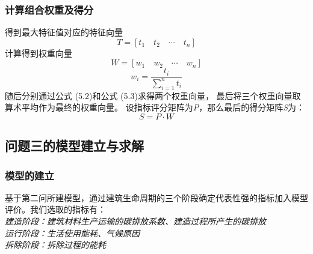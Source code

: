 \documentclass[a4paper, 12pt]{article}
\numberwithin{equation}{section}
\begin{document}
                \subsubsection{计算组合权重及得分}
                    得到最大特征值对应的特征向量
                    \[ T = [t_1 \quad t_2 \quad \cdots \quad t_n] \]
                    \newline
                    计算得到权重向量
                    \[ W = [w_1 \quad w_2 \quad \cdots \quad w_n ] \]
                    \begin{equation*}
                        w_i = \frac{t_i}{\sum_{i=1}^{n} t_i}
                    \end{equation*}
                    \newline
                    随后分别通过公式 (5.2)和公式 (5.3)求得两个权重向量， 最后将三个权重向量取算术平均作为最终的权重向量。
                    设指标评分矩阵为\textit{P}，那么最后的得分矩阵\textit{S}为：
                    \[ S = P \cdot W \]


            \subsection{问题三的模型建立与求解}
                \subsubsection{模型的建立}
                    基于第二问所建模型，通过建筑生命周期的三个阶段确定代表性强的指标加入模型评价。我们选取的指标有： \\
                    \textit{建造阶段：建筑材料生产运输的碳排放系数、建造过程所产生的碳排放} \\
                    \textit{运行阶段：生活使用能耗、气候原因} \\
                    \textit{拆除阶段：拆除过程的能耗}
\end{document}
